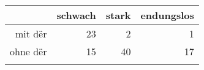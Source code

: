 \begin{tabular}{rrrr}
  \lsptoprule
 & schwach & stark & endungslos \\ 
  \midrule
mit dër & 23 & 2 & 1 \\ 
  ohne dër & 15 & 40 & 17 \\ 
   \lspbottomrule
\end{tabular}
